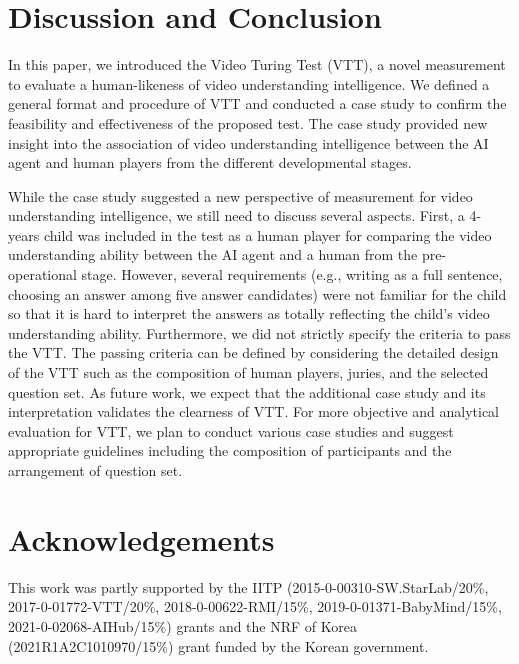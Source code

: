 \documentclass[letterpaper]{article} %
\begin{document}

\section{Discussion and Conclusion}
In this paper, we introduced the Video Turing Test (VTT), a novel measurement to evaluate a human-likeness of video understanding intelligence. We defined a general format and procedure of VTT and conducted a case study to confirm the feasibility and effectiveness of the proposed test. The case study provided new insight into the association of video understanding intelligence between the AI agent and human players from the different developmental stages.

While the case study suggested a new perspective of measurement for video understanding intelligence, we still need to discuss several aspects. First, a 4-years child was included in the test as a human player for comparing the video understanding ability between the AI agent and a human from the pre-operational stage. However, several requirements (e.g., writing as a full sentence, choosing an answer among five answer candidates) were not familiar for the child so that it is hard to interpret the answers as totally reflecting the child's video understanding ability. 
Furthermore, we did not strictly specify the criteria to pass the VTT. The passing criteria can be defined by considering the detailed design of the VTT such as the composition of human players, juries, and the selected question set. As future work, we expect that the additional case study and its interpretation validates the clearness of VTT. For more objective and analytical evaluation for VTT, we plan to conduct various case studies and suggest appropriate guidelines including the composition of participants and the arrangement of question set.

\section{Acknowledgements}
This work was partly supported by the IITP (2015-0-00310-SW.StarLab/20\%, 2017-0-01772-VTT/20\%, 2018-0-00622-RMI/15\%, 2019-0-01371-BabyMind/15\%, 2021-0-02068-AIHub/15\%) grants and the NRF of Korea (2021R1A2C1010970/15\%) grant funded by the Korean government.



\end{document}
